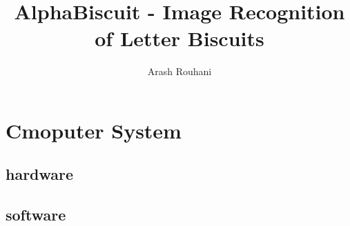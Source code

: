 \documentclass[a4paper,11pt]{article}
\title{AlphaBiscuit - Image Recognition of Letter Biscuits}
\author{Arash Rouhani}
\begin{document}
\maketitle

\begin{abstract}

\end{abstract}

\section{Cmoputer System}
\subsection{hardware}
\subsection{software}
\end{document}

